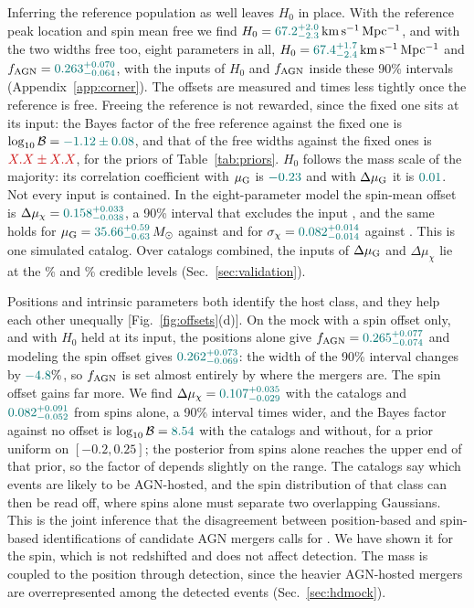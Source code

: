 \documentclass[aps,prd,reprint,twocolumn,superscriptaddress,nofootinbib,floatfix]{revtex4-2}
\newcommand{\msun}{\,M_\odot}
\newcommand{\kms}{{\rm km\,s^{-1}\,Mpc^{-1}}}
\newcommand{\fagn}{f_{\rm AGN}}
\newcommand{\dmuG}{\Delta\mu_{\rm G}}
\newcommand{\dmuchi}{\Delta\mu_\chi}
\newcommand{\lB}{\log_{10}\mathcal{B}}
\newcommand{\req}[1]{#1}
\providecommand{\PriorSpinDmuChiLo}{\req{-0.2}}
\providecommand{\PriorSpinDmuChiHi}{\req{0.25}}
\begin{document}
Inferring the reference population as well leaves $H_0$ in place. With the
reference peak location and spin mean free we find $H_0=\HDFreeHzero\,\kms$,
and with the two widths free too, eight parameters in all,
$H_0=\HDEightHzero\,\kms$ and $\fagn=\HDEightfAGN$, with the inputs of $H_0$
and $\fagn$ inside these 90\% intervals (Appendix~\ref{app:corner}). The offsets are measured \WRatioFreeDmuGOverFix{} and
\WRatioFreeDmuChiOverFix{} times less tightly once the reference is free.
Freeing the reference is not rewarded, since the fixed one sits at its
input: the Bayes factor of the free reference against the fixed one is
$\lB=\LBFreeRefVsFix$, and that of the free widths against the fixed ones is
$\LBEightVsFree$, for the priors of Table~\ref{tab:priors}. $H_0$ follows the mass scale of the majority:
its correlation coefficient with $\mu_{\rm G}$ is $\HDEightRhoHzeroMuG$ and
with $\dmuG$ it is $\HDEightRhoHzeroDmuG$. Not every input is contained. In the
eight-parameter model the spin-mean offset is $\dmuchi=\HDEightDmuChi$, a
90\% interval that excludes the input \MockDmuChi, and the same holds for
$\mu_{\rm G}=\HDEightMuG\msun$ against \MockMuG{} and for
$\sigma_\chi=\HDEightSigmaChi$ against \MockSigmaChi. This is one simulated
catalog. Over \HDNcat{} catalogs combined, the inputs of $\dmuG$ and
$\dmuchi$ lie at the \HDEightDmuGCombLevel\% and \HDEightDmuChiCombLevel\%
credible levels (Sec.~\ref{sec:validation}).

Positions and intrinsic parameters both identify the host class, and they
help each other unequally [Fig.~\ref{fig:offsets}(d)]. On the mock with a
spin offset only, and with $H_0$ held at its input, the positions alone give
$\fagn=\SpinPosfAGN$ and modeling the spin offset gives $\SpinBothfAGN$: the
width of the 90\% interval changes by $\SpinfWidthChange\%$, so $\fagn$ is
set almost entirely by where the mergers are. The spin offset gains far more. We
find $\dmuchi=\SpinBothDmuChi$ with the catalogs and $\SpinIntDmuChi$ from
spins alone, a 90\% interval \SpinDmuChiWidthRatio{} times wider, and the
Bayes factor against no offset is $\lB=\LBSpinFixH$ with the catalogs and
\LBSpinIntFixH{} without, for a prior uniform on
$[\PriorSpinDmuChiLo,\PriorSpinDmuChiHi]$; the posterior from spins alone
reaches the upper end of that prior, so the factor of \SpinDmuChiWidthRatio{}
depends slightly on the range. The catalogs say which events are likely to be AGN-hosted, and the
spin distribution of that class can then be read off, where spins alone must
separate two overlapping Gaussians. This is the joint inference that the
disagreement between position-based and spin-based identifications of
candidate AGN mergers calls for \cite{Pouw:2026lar,Bartos:2026xlt}. We have
shown it for the spin, which is not redshifted and does not affect
detection. The mass is coupled to the position through detection, since the
heavier AGN-hosted mergers are overrepresented among the detected events
(Sec.~\ref{sec:hdmock}).
\end{document}
